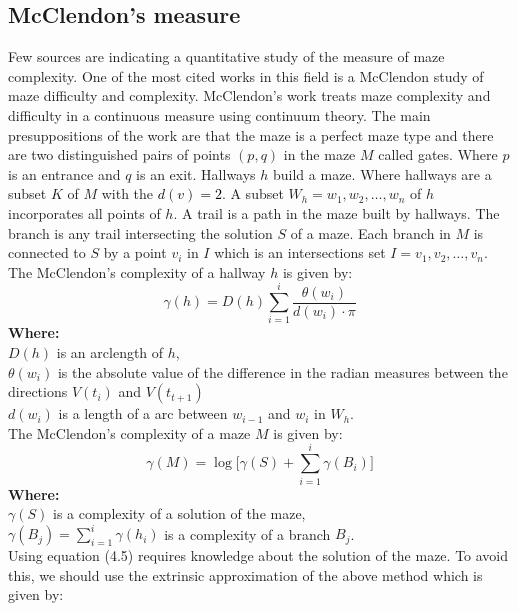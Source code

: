 \subsection{McClendon's measure}
Few sources are indicating a quantitative study of the measure of maze complexity. One of the most cited works in this field is a McClendon \textcolor{black}{\cite{14}} study of maze difficulty and complexity. 
McClendon’s work treats maze complexity and difficulty in a continuous measure using continuum theory. The main presuppositions of the work are that the maze is a perfect maze type and there are two distinguished pairs of points $(p,q)$ in the maze $M$ called gates. Where $p$ is an entrance and $q$ is an exit.  Hallways  $h$ build a maze. 
Where hallways are a subset $K$ of $M$ with the \textcolor{black}{$d(v) = 2$}. A subset $W_h = {w_1,w_2,\ldots, w_n}$ of $h$ incorporates all points of $h$. 
A trail is a path in the maze built by hallways. The branch is any trail intersecting the solution $S$ of a maze. Each branch in $M$ is connected to $S$ by a point $v_i$ in $I$ which is an intersections set $I = {v_1,v_2,\dots, v_n}$. The McClendon’s complexity of a hallway $h$ is given by:\\
\begin{equation}
\gamma(h) = D(h)\sum_{i = 1}^{i} \frac{\theta(w_i)}{d(w_i)\cdot \pi}
\end{equation}
\textbf{Where:}\\
$D(h)$ is an arclength of $h$,\\ 
$\theta(w_i)$ is the absolute value of the difference in the radian measures between the directions $V(t_i)$ and $V(t_{t+1})$\\ 
$d(w_i)$ is a length of a arc between $w_{i-1}$ and $w_i$ in $W_h$.\\ 
\newline
The McClendon’s complexity of a maze $M$ is given by:\\
\begin{equation}
\gamma(M)=\log\bigl[\gamma(S) + \sum_{i = 1}^{i} \gamma(B_i) \bigr]
\end{equation}
\textbf{Where:}\\
$\gamma(S)$ is a complexity of a solution of the maze,\\
$\gamma(B_j) = \sum_{i = 1}^{i} \gamma(h_i)$ is a complexity of a branch $B_j$.\\
\newline 
Using equation (4.5) requires knowledge about the solution of the maze. To avoid this, we should use the extrinsic approximation of the above method which is given by:\\
